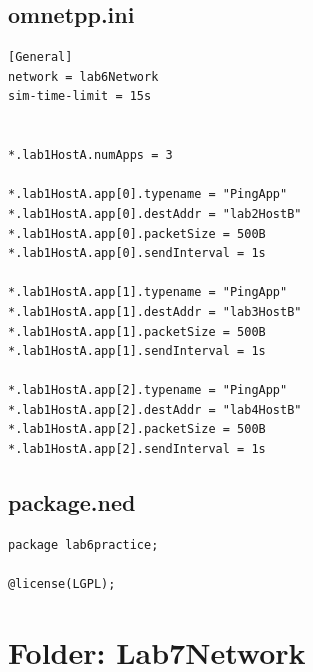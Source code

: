 \documentclass[11pt,a4paper]{article}
\begin{document}
\subsection*{omnetpp.ini}
\begin{lstlisting}[style=labcode]
[General]
network = lab6Network
sim-time-limit = 15s


*.lab1HostA.numApps = 3

*.lab1HostA.app[0].typename = "PingApp"
*.lab1HostA.app[0].destAddr = "lab2HostB"
*.lab1HostA.app[0].packetSize = 500B
*.lab1HostA.app[0].sendInterval = 1s

*.lab1HostA.app[1].typename = "PingApp"
*.lab1HostA.app[1].destAddr = "lab3HostB"
*.lab1HostA.app[1].packetSize = 500B
*.lab1HostA.app[1].sendInterval = 1s

*.lab1HostA.app[2].typename = "PingApp"
*.lab1HostA.app[2].destAddr = "lab4HostB"
*.lab1HostA.app[2].packetSize = 500B
*.lab1HostA.app[2].sendInterval = 1s
\end{lstlisting}

\subsection*{package.ned}
\begin{lstlisting}[style=labcode]
package lab6practice;

@license(LGPL);
\end{lstlisting}

\section{Folder: Lab7Network}
\end{document}
